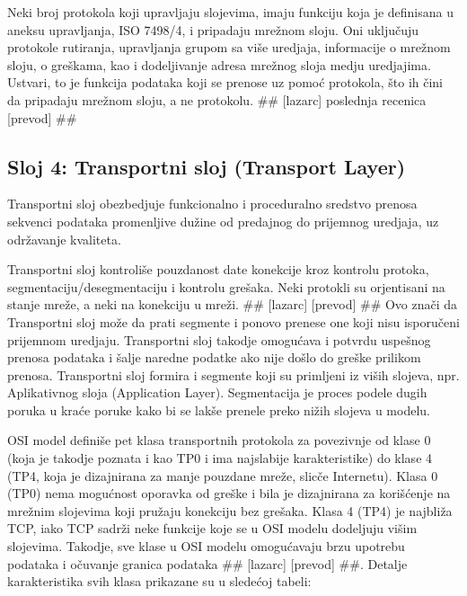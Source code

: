 \documentclass[a4paper,12pt, master]{etf}
\begin{document}
	Neki broj protokola koji upravljaju slojevima, imaju funkciju koja je 
	definisana u aneksu	upravljanja, ISO 7498/4, i pripadaju mre\v{z}nom sloju. 
	Oni uklju\v{c}uju protokole rutiranja, upravljanja grupom sa vi\v{s}e 
	uredjaja, informacije o mre\v{z}nom sloju, o gre\v{s}kama, kao i
	dodeljivanje adresa mre\v{z}nog sloja medju uredjajima. Ustvari, to je 
	funkcija podataka koji se prenose uz pomo\'{c} protokola, \v{s}to ih 
	\v{c}ini da pripadaju mre\v{z}nom sloju, a ne protokolu.
	\#\# [lazarc] poslednja	recenica [prevod] \#\#

	\subsection{Sloj 4: Transportni sloj (Transport Layer)}

	Transportni sloj obezbedjuje funkcionalno i proceduralno sredstvo prenosa 
	sekvenci podataka promenljive du\v{z}ine od predajnog do prijemnog uredjaja,
	 uz odr\v{z}avanje kvaliteta.

	Transportni sloj kontroli\v{s}e pouzdanost date konekcije kroz kontrolu 
	protoka, segmentaciju/desegmentaciju i kontrolu gre\v{s}aka. Neki protokli 
	su orjentisani na stanje mre\v{z}e, a neki na konekciju u mre\v{z}i. 
	\#\# [lazarc] [prevod] \#\# Ovo zna\v{c}i da Transportni sloj mo\v{z}e da 
	prati segmente i ponovo prenese one koji nisu isporu\v{c}eni prijemnom 
	uredjaju. Transportni sloj takodje omogu\'{c}ava i potvrdu uspe\v{s}nog 
	prenosa podataka i \v{s}alje naredne podatke ako nije do\v{s}lo do 
	gre\v{s}ke prilikom prenosa. Transportni sloj formira i segmente koji su 
	primljeni iz vi\v{s}ih slojeva, npr. Aplikativnog sloja (Application Layer).
	Segmentacija je proces podele dugih poruka u kra\'{c}e poruke kako bi se 
	lak\v{s}e prenele preko	ni\v{z}ih slojeva u modelu.

	OSI model defini\v{s}e pet klasa transportnih protokola za povezivnje od 
	klase 0 (koja je takodje poznata i kao TP0 i ima najslabije karakteristike) 
	do klase 4 (TP4, koja je dizajnirana za manje pouzdane mre\v{z}e, 
	slic\v{c}e Internetu). Klasa 0 (TP0) nema mogu\'{c}nost	oporavka od 
	gre\v{s}ke i bila je dizajnirana za kori\v{s}\'{c}enje na mre\v{z}nim 
	slojevima koji pru\v{z}aju konekciju bez gre\v{s}aka. Klasa 4 (TP4) je 
	najbli\v{z}a TCP, iako TCP sadr\v{z}i neke funkcije koje se u OSI modelu 
	dodeljuju vi\v{s}im slojevima. Takodje, sve klase u OSI modelu 
	omogu\'{c}avaju	brzu upotrebu podataka i o\v{c}uvanje granica podataka 
	\#\# [lazarc] [prevod] \#\#. Detalje karakteristika svih klasa prikazane su 
	u slede\'{c}oj tabeli:
\end{document}
